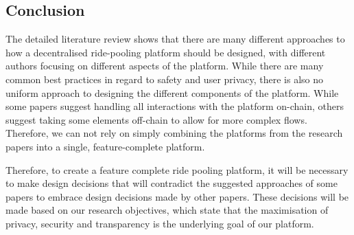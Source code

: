 \subsection{Conclusion}
The detailed literature review shows that there are many different approaches to how a decentralised ride-pooling platform should be designed, with different authors focusing on different aspects of the platform. While there are many common best practices in regard to safety and user privacy, there is also no uniform approach to designing the different components of the platform. While some papers suggest handling all interactions with the platform on-chain, others suggest taking some elements off-chain to allow for more complex flows. Therefore, we can not rely on simply combining the platforms from the research papers into a single, feature-complete platform.

Therefore, to create a feature complete ride pooling platform, it will be necessary to make design decisions that will contradict the suggested approaches of some papers to embrace design decisions made by other papers. These decisions will be made based on our research objectives, which state that the maximisation of privacy, security and transparency is the underlying goal of our platform.


